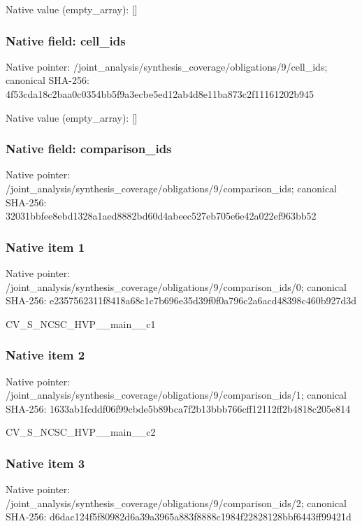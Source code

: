 \documentclass[10pt,a4paper]{article}
\begin{document}
Native value (empty\_\allowbreak{}array): []

\subsubsection{Native field: cell\_\allowbreak{}ids}
Native pointer: /joint\_\allowbreak{}analysis/synthesis\_\allowbreak{}coverage/obligations/9/cell\_\allowbreak{}ids; canonical SHA-256: 4f53cda18c2baa0c0354bb5f9a3ecbe5ed12ab4d8e11ba873c2f11161202b945

Native value (empty\_\allowbreak{}array): []

\subsubsection{Native field: comparison\_\allowbreak{}ids}
Native pointer: /joint\_\allowbreak{}analysis/synthesis\_\allowbreak{}coverage/obligations/9/comparison\_\allowbreak{}ids; canonical SHA-256: 32031bbfee8ebd1328a1aed8882bd60d4abeec527eb705e6e42a022ef963bb52

\subsubsection{Native item 1}
Native pointer: /joint\_\allowbreak{}analysis/synthesis\_\allowbreak{}coverage/obligations/9/comparison\_\allowbreak{}ids/0; canonical SHA-256: e2357562311f8418a68c1c7b696e35d39f0f0a796c2a6acd48398c460b927d3d

\begingroup\raggedright\sloppy CV\_\allowbreak{}S\_\allowbreak{}NCSC\_\allowbreak{}HVP\_\allowbreak{}\_\allowbreak{}main\_\allowbreak{}\_\allowbreak{}c1\par\endgroup

\subsubsection{Native item 2}
Native pointer: /joint\_\allowbreak{}analysis/synthesis\_\allowbreak{}coverage/obligations/9/comparison\_\allowbreak{}ids/1; canonical SHA-256: 1633ab1fcddf06f99cbde5b89bca7f2b13bbb766cff12112ff2b4818c205e814

\begingroup\raggedright\sloppy CV\_\allowbreak{}S\_\allowbreak{}NCSC\_\allowbreak{}HVP\_\allowbreak{}\_\allowbreak{}main\_\allowbreak{}\_\allowbreak{}c2\par\endgroup

\subsubsection{Native item 3}
Native pointer: /joint\_\allowbreak{}analysis/synthesis\_\allowbreak{}coverage/obligations/9/comparison\_\allowbreak{}ids/2; canonical SHA-256: d6dac124f5f80982d6a39a3965a883f8888c1984f22828128bbf6443ff99421d
\end{document}
